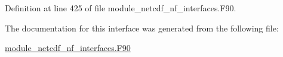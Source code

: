 Definition at line 425 of file module\+\_\+netcdf\+\_\+nf\+\_\+interfaces.\+F90.



The documentation for this interface was generated from the following file\+:\begin{DoxyCompactItemize}
\item 
\hyperlink{module__netcdf__nf__interfaces_8F90}{module\+\_\+netcdf\+\_\+nf\+\_\+interfaces.\+F90}\end{DoxyCompactItemize}

